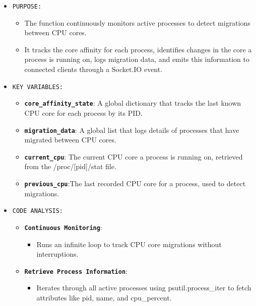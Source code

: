 \documentclass[12pt]{article}
\begin{document}
\begin{itemize}
    \item \texttt{PURPOSE:}
    \begin{itemize}
        \item The function continuously monitors active processes to detect migrations between CPU cores. 
        \item It tracks the core affinity for each process, identifies changes in the core a process is running on, logs migration data, and emits this information to connected clients through a Socket.IO event.
    \end{itemize}
    \item \texttt{KEY VARIABLES:}
    \begin{itemize}
        \item \textbf{\texttt{core\_affinity\_state}}: A global dictionary that tracks the last known CPU core for each process by its PID.
        \item \textbf{\texttt{migration\_data}}:  A global list that logs details of processes that have migrated between CPU cores.
        \item \textbf{\texttt{current\_cpu}}: The current CPU core a process is running on, retrieved from the /proc/[pid]/stat file.
        \item \textbf{\texttt{previous\_cpu}}:The last recorded CPU core for a process, used to detect migrations.
    \end{itemize}
    \item \texttt{CODE ANALYSIS:}
    \begin{itemize}
        \item \textbf{\texttt{Continuous Monitoring}}:
        \begin{itemize}
              \item Runs an infinite loop to track CPU core migrations without interruptions.
        \end{itemize}
       \item \textbf{\texttt{Retrieve Process Information}}:
       \begin{itemize}
            \item Iterates through all active processes using psutil.process\_iter to fetch attributes like pid, name, and cpu\_percent.

\end{itemize}
\end{itemize}
\end{itemize}
\end{document}
